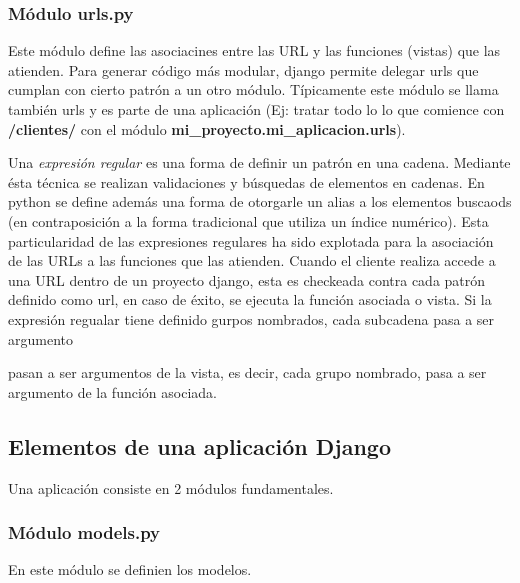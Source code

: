 \documentclass[a4paper]{report}
\begin{document}
\subsubsection*{Módulo urls.py}
  Este módulo define las asociacines entre las URL y las funciones (vistas) que
las
atienden. Para generar código más modular, django permite delegar urls que
cumplan
con cierto patrón a un otro módulo. Típicamente este módulo se llama también
urls y 
es parte de una aplicación (Ej: tratar todo lo lo que comience con
\textbf{/clientes/} con el módulo
\textbf{mi\_proyecto.mi\_aplicacion.urls}).

Una \emph{expresión regular} es una forma de definir un patrón en una cadena.
Mediante
ésta técnica se realizan validaciones y búsquedas de elementos en cadenas. En
python
se define además una forma de otorgarle un alias a los elementos buscaods (en
contraposición
a la forma tradicional que utiliza un índice numérico).
Esta particularidad de las expresiones regulares ha sido explotada para la
asociación
de las URLs a las funciones que las atienden.
Cuando el cliente realiza accede a una URL dentro de un proyecto django, esta es
checkeada
contra cada patrón definido como url, en caso de éxito, se ejecuta la función
asociada o vista.
Si la expresión regualar tiene definido gurpos nombrados, cada subcadena pasa a
ser argumento

pasan a ser argumentos de la vista, es decir, cada grupo nombrado, pasa a ser
argumento
de la función asociada.

\subsection*{Elementos de una aplicación Django}

Una aplicación consiste en 2 módulos fundamentales.
\subsubsection*{Módulo models.py}
En este módulo se definien los modelos.
\end{document}
